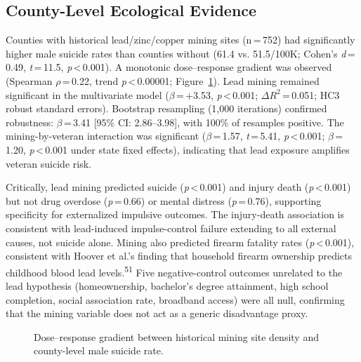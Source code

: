 \documentclass[11pt,twocolumn]{article}
\begin{document}
\subsection{County-Level Ecological Evidence}

Counties with historical lead/zinc/copper mining sites (n\,=\,752) had significantly higher male suicide rates than counties without (61.4 vs. 51.5/100K; Cohen's \textit{d}\,=\,0.49, \textit{t}\,=\,11.5, \textit{p}\,<\,0.001). A monotonic dose--response gradient was observed (Spearman $\rho$\,=\,0.22, trend \textit{p}\,<\,0.00001; Figure~\ref{fig:mining}). Lead mining remained significant in the multivariate model ($\beta$\,=\,+3.53, \textit{p}\,<\,0.001; $\Delta R^2$\,=\,0.051; HC3 robust standard errors). Bootstrap resampling (1,000 iterations) confirmed robustness: $\beta$\,=\,3.41 [95\% CI: 2.86--3.98], with 100\% of resamples positive. The mining-by-veteran interaction was significant ($\beta$\,=\,1.57, \textit{t}\,=\,5.41, \textit{p}\,<\,0.001; $\beta$\,=\,1.20, \textit{p}\,<\,0.001 under state fixed effects), indicating that lead exposure amplifies veteran suicide risk.

Critically, lead mining predicted suicide (\textit{p}\,<\,0.001) and injury death (\textit{p}\,<\,0.001) but not drug overdose (\textit{p}\,=\,0.66) or mental distress (\textit{p}\,=\,0.76), supporting specificity for externalized impulsive outcomes. The injury-death association is consistent with lead-induced impulse-control failure extending to all external causes, not suicide alone. Mining also predicted firearm fatality rates (\textit{p}\,<\,0.001), consistent with Hoover et al.'s finding that household firearm ownership predicts childhood blood lead levels.\textsuperscript{51} Five negative-control outcomes unrelated to the lead hypothesis (homeownership, bachelor's degree attainment, high school completion, social association rate, broadband access) were all null, confirming that the mining variable does not act as a generic disadvantage proxy.

\begin{figure}[H]
\centering
{}
\caption{Dose--response gradient between historical mining site density and county-level male suicide rate.}
\label{fig:mining}
\end{figure}
\end{document}
